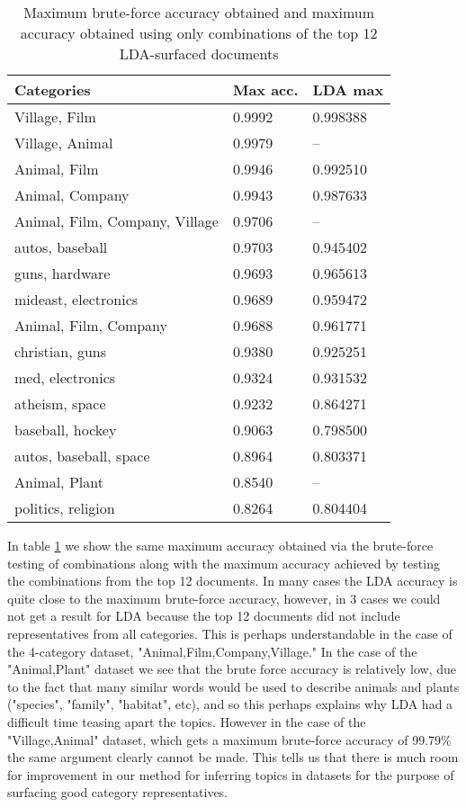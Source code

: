 \begin{table}[]
\centering
\captionsetup{position=bottom}
\begin{tabular}{lll}
\toprule
Categories                  & Max acc. & LDA max \\
\midrule
Village, Film                & 0.9992       & 0.998388    \\
Village, Animal              & 0.9979       & --         \\
Animal, Film                 & 0.9946       & 0.992510    \\
Animal, Company              & 0.9943       & 0.987633    \\
Animal, Film, Company, Village & 0.9706       & --         \\
autos, baseball              & 0.9703       & 0.945402    \\
guns, hardware               & 0.9693       & 0.965613    \\
mideast, electronics         & 0.9689       & 0.959472    \\
Animal, Film, Company         & 0.9688       & 0.961771    \\
christian, guns              & 0.9380       & 0.925251    \\
med, electronics             & 0.9324       & 0.931532    \\
atheism, space               & 0.9232       & 0.864271    \\
baseball, hockey             & 0.9063       & 0.798500    \\
autos, baseball, space        & 0.8964       & 0.803371    \\
Animal, Plant                & 0.8540       & --         \\
politics, religion           & 0.8264       & 0.804404   \\
\bottomrule
\end{tabular}
\caption{Maximum brute-force accuracy obtained and maximum accuracy obtained using only combinations of the top 12 LDA-surfaced documents}\label{ldaacc}
\end{table}

In table \ref{ldaacc} we show the same maximum accuracy obtained via the brute-force testing of combinations along with the maximum accuracy achieved by testing the combinations from the top 12 documents. In many cases the LDA accuracy is quite close to the maximum brute-force accuracy, however, in 3 cases we could not get a result for LDA because the top 12 documents did not include representatives from all categories. This is perhaps understandable in the case of the 4-category dataset, "Animal,Film,Company,Village." In the case of the "Animal,Plant" dataset we see that the brute force accuracy is relatively low, due to the fact that many similar words would be used to describe animals and plants ("species", "family", "habitat", etc), and so this perhaps explains why LDA had a difficult time teasing apart the topics. However in the case of the "Village,Animal" dataset, which gets a maximum brute-force accuracy of 99.79\% the same argument clearly cannot be made. This tells us that there is much room for improvement in our method for inferring topics in datasets for the purpose of surfacing good category representatives.

